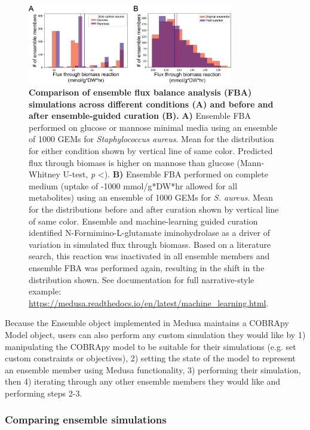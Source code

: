 \documentclass[11pt,twocolumn,notitlepage,openany,twoside]{book}
\begin{document}
\begin{refsection}
\begin{figure}[tb]
\centering
\includegraphics[width=0.8\textwidth]{ch4_fig3}
\caption[ Comparison of ensemble flux balance analysis (FBA) simulations across different conditions (A) and before and after ensemble-guided curation (B).]{\textbf{ Comparison of ensemble flux balance analysis (FBA) simulations across different conditions (A) and before and after ensemble-guided curation (B).} \textbf{A)} Ensemble FBA performed on glucose or mannose minimal media using an ensemble of 1000 GEMs for \textit{Staphylococcus aureus}. Mean for the distribution for either condition shown by vertical line of same color. Predicted flux through biomass is higher on mannose than glucose (Mann-Whitney U-test, \textit{p} \textless{}). \textbf{B)} Ensemble FBA performed on complete medium (uptake of -1000 mmol/g*DW*hr allowed for all metabolites) using an ensemble of 1000 GEMs for \textit{S. aureus}. Mean for the distributions before and after curation shown by vertical line of same color. Ensemble and machine-learning guided curation identified N-Formimino-L-glutamate iminohydrolase as a driver of variation in simulated flux through biomass. Based on a literature search, this reaction was inactivated in all ensemble members and ensemble FBA was performed again, resulting in the shift in the distribution shown. See documentation for full narrative-style example: \url{https://medusa.readthedocs.io/en/latest/machine_learning.html}.}
\end{figure}


Because the Ensemble object implemented in Medusa maintains a COBRApy Model object, users can also perform any custom simulation they would like by 1) manipulating the COBRApy model to be suitable for their simulations (e.g. set custom constraints or objectives), 2) setting the state of the model to represent an ensemble member using Medusa functionality, 3) performing their simulation, then 4) iterating through any other ensemble members they would like and performing steps 2-3.

\subsubsection{Comparing ensemble simulations}


\end{refsection}
\end{document}
